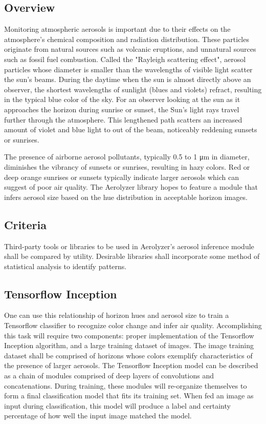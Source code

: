 \documentclass[onecolumn, draftclsnofoot,10pt, compsoc]{IEEEtran}
\begin{document}
\begin{singlespace}
	\subsection{Overview}
		Monitoring atmospheric aerosols is important due to their effects on the atmosphere's chemical composition and radiation distribution.
		These particles originate from natural sources such as volcanic eruptions, and unnatural sources such as fossil fuel combustion.
		Called the "Rayleigh scattering effect", aerosol particles whose diameter is smaller than the wavelengths of visible light scatter the sun’s beams.
		During the daytime when the sun is almost directly above an observer, the shortest wavelengths of sunlight (blues and violets) refract, resulting in the typical blue color of the sky.
		For an observer looking at the sun as it approaches the horizon during sunrise or sunset, the Sun’s light rays travel further through the atmosphere.
		This lengthened path scatters an increased amount of violet and blue light to out of the beam, noticeably reddening sunsets or sunrises. \cite{corfidi_2014}
		

		The presence of airborne aerosol pollutants, typically 0.5 to 1 μm in diameter, diminishes the vibrancy of sunsets or sunrises, resulting in hazy colors.
		Red or deep orange sunrises or sunsets typically indicate larger aerosols which can suggest of poor air quality. \cite{corfidi_2014}
		The Aerolyzer library hopes to feature a module that infers aerosol size based on the hue distribution in acceptable horizon images. 
		
	\subsection{Criteria}
		Third-party tools or libraries to be used in Aerolyzer's aerosol inference module shall be compared by utility.
		Desirable libraries shall incorporate some method of statistical analysis to identify patterns.



	\subsection{Tensorflow Inception}
		One can use this relationship of horizon hues and aerosol size to train a Tensorflow classifier to recognize color change and infer air quality.
		Accomplishing this task will require two components: proper implementation of the Tensorflow Inception algorithm, and a large training dataset of images.
		The image training dataset shall be comprised of horizons whose colors exemplify characteristics of the presence of larger aerosols.
		The Tensorflow Inception model can be described as a chain of modules comprised of deep layers of convolutions and concatenations.
		During training, these modules will re-organize themselves to form a final classification model that fits its training set.
		When fed an image as input during classification, this model will produce a label and certainty percentage of how well the input image matched the model. \cite{tensorflow}


\end{singlespace}
\end{document}
